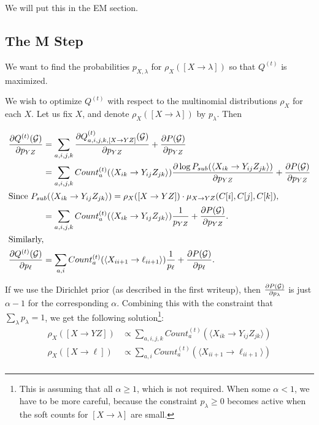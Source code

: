 \documentclass{article}
\begin{document}
We will put this in the EM section.


\subsection{The M Step}

We want to find the probabilities $p_{X,\lambda}$ for $\rho_X([X\to
\lambda])$ so that $Q^{(t)}$ is maximized.

We wish to optimize $Q^{(t)}$ with respect to the multinomial
distributions $\rho_X$ for each $X$. Let us fix $X$, and denote
$\rho_X([X\to \lambda])$ by $p_\lambda$. Then

\begin{align*}
\frac{\partial Q^{(t)}({\mathcal G})}{\partial p_{YZ}} &=
\sum_{a,i,j,k} \frac{\partial Q^{(t)}_{a,i,j,k,[X\to
    YZ]}({\mathcal G})}{\partial p_{YZ}} + \frac{\partial P({\mathcal G})}{\partial p_{YZ}} \\
&= 
\sum_{a,i,j,k} Count^{(t)}_a(\langle X_{ik} \to Y_{ij} Z_{jk} \rangle)
\frac{\partial \log P_{sub}(\langle X_{ik} \to
  Y_{ij}Z_{jk}\rangle)}{\partial p_{YZ}} + \frac{\partial
  P({\mathcal G})}{\partial p_{YZ}} \\
\intertext{Since $P_{sub}(\langle X_{ik} \to
  Y_{ij}Z_{jk}\rangle) = \rho_X([X\to YZ]) \cdot \mu_{X\to
    YZ}(C[i],C[j],C[k]),$ }
&= 
\sum_{a,i,j,k} Count^{(t)}_a(\langle X_{ik} \to Y_{ij} Z_{jk} \rangle)
\frac{1}{p_{YZ}} + \frac{\partial
  P({\mathcal G})}{\partial p_{YZ}}. \\
\intertext{Similarly,}
\frac{\partial Q^{(t)}({\mathcal G})}{\partial p_{\ell}} &=
\sum_{a,i} Count^{(t)}_a(\langle X_{i i+1} \to \ell_{i i+1} \rangle)
\frac{1}{p_{\ell}} + \frac{\partial
  P({\mathcal G})}{\partial p_{\ell}}. \\
\end{align*}

If we use the Dirichlet prior (as described in the first writeup),
then $\frac{\partial P({\mathcal G})}{\partial p_{\lambda}}$ is just $\alpha -
1$ for the corresponding $\alpha$. Combining this with the constraint
that $\sum_\lambda {p_\lambda}=1$, we get the following solution\footnote{This
  is assuming that all $\alpha\ge 1$, which is not required. When some
  $\alpha < 1$, we have to be more careful, because the constraint
  $p_\lambda \ge 0$ becomes active when the soft counts for $[X\to
  \lambda]$ are small.}:
\begin{align*}
  \rho_{X}([X\to YZ]) &\propto \sum_{a,i,j,k} Count^{(t)}_a(\langle
  X_{ik} \to Y_{ij} Z_{jk} \rangle)\\
  \rho_{X}([X\to \ell]) &\propto \sum_{a,i} Count^{(t)}_a(\langle
  X_{i i+1} \to \ell_{i i+1} \rangle)\\
\end{align*}
\end{document}
